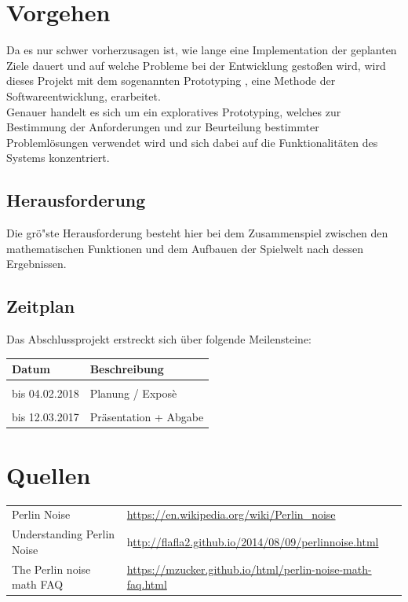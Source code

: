 \documentclass[a4paper]{article}
\begin{document}
	\section{Vorgehen}
		Da es nur schwer vorherzusagen ist, wie lange eine Implementation der geplanten Ziele dauert und auf welche Probleme bei der Entwicklung gestoßen wird,
		wird dieses Projekt mit dem sogenannten \glqq Prototyping \grqq{}, eine Methode der Softwareentwicklung, erarbeitet. \\
		Genauer handelt es sich um ein exploratives Prototyping, welches zur Bestimmung der Anforderungen und zur Beurteilung bestimmter Problemlösungen verwendet
		wird und sich dabei auf die Funktionalitäten des Systems konzentriert.


		\subsection{Herausforderung}
		Die gr\"o"ste  Herausforderung besteht hier bei dem Zusammenspiel zwischen den mathematischen Funktionen und dem Aufbauen der Spielwelt nach dessen Ergebnissen.


		\subsection{Zeitplan}
		Das Abschlussprojekt erstreckt sich \"uber folgende Meilensteine:\\

		\begin{tabular}{l | l}
  			Datum & Beschreibung \\
			\hline \\
			bis 04.02.2018 & Planung / Expos\`e \\ \\
			bis 12.03.2017 & Pr\"asentation + Abgabe \\
 		\end{tabular}

		

	\section{Quellen}
	
	\begin{tabular}{l l}
		Perlin Noise & \url{https://en.wikipedia.org/wiki/Perlin_noise} \\
		Understanding Perlin Noise & h\url{ttp://flafla2.github.io/2014/08/09/perlinnoise.html} \\
		The Perlin noise math FAQ & \url{https://mzucker.github.io/html/perlin-noise-math-faq.html} \\
	\end{tabular}
   
\end{document}

